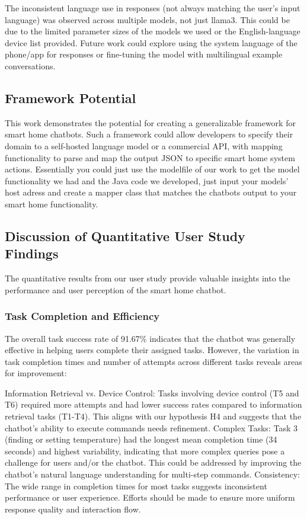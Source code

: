 The inconsistent language use in responses (not always matching the user's input language) was observed across multiple models, not just llama3. This could be due to the limited parameter sizes of the models we used or the English-language device list provided. Future work could explore using the system language of the phone/app for responses or fine-tuning the model with multilingual example conversations.

\subsection{Framework Potential}
This work demonstrates the potential for creating a generalizable framework for smart home chatbots. Such a framework could allow developers to specify their domain to a self-hosted language model or a commercial API, with mapping functionality to parse and map the output JSON to specific smart home system actions. Essentially you could just use the modelfile of our work to get the model functionality we had and the Java code we developed, just input your models' host adress and create a mapper class that matches the chatbots output to your smart home functionality.

\subsection{Discussion of Quantitative User Study Findings}
The quantitative results from our user study provide valuable insights into the performance and user perception of the smart home chatbot.
\subsubsection{Task Completion and Efficiency}
The overall task success rate of 91.67\% indicates that the chatbot was generally effective in helping users complete their assigned tasks. However, the variation in task completion times and number of attempts across different tasks reveals areas for improvement:

Information Retrieval vs. Device Control: Tasks involving device control (T5 and T6) required more attempts and had lower success rates compared to information retrieval tasks (T1-T4). This aligns with our hypothesis H4 and suggests that the chatbot's ability to execute commands needs refinement.
Complex Tasks: Task 3 (finding or setting temperature) had the longest mean completion time (34 seconds) and highest variability, indicating that more complex queries pose a challenge for users and/or the chatbot. This could be addressed by improving the chatbot's natural language understanding for multi-step commands.
Consistency: The wide range in completion times for most tasks suggests inconsistent performance or user experience. Efforts should be made to ensure more uniform response quality and interaction flow.

